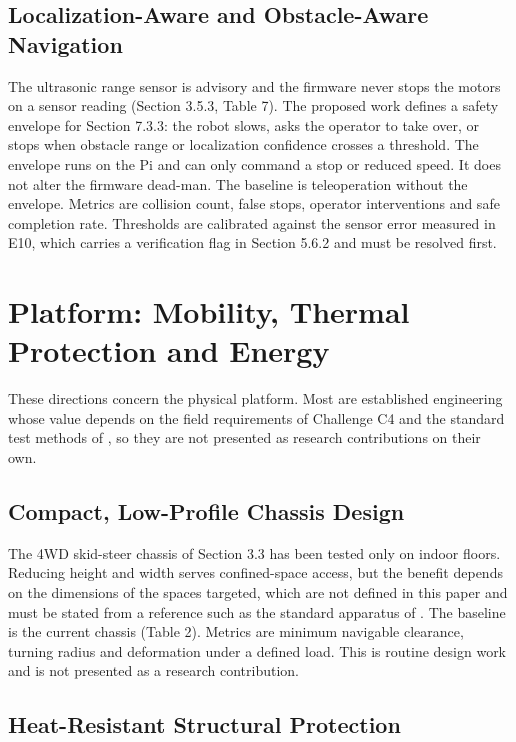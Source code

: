 \subsection{Localization-Aware and Obstacle-Aware Navigation}

The ultrasonic range sensor is advisory and the firmware never stops the motors on a sensor reading (Section 3.5.3, Table 7). The proposed work defines a safety envelope for Section 7.3.3: the robot slows, asks the operator to take over, or stops when obstacle range or localization confidence crosses a threshold. The envelope runs on the Pi and can only command a stop or reduced speed. It does not alter the firmware dead-man. The baseline is teleoperation without the envelope. Metrics are collision count, false stops, operator interventions and safe completion rate. Thresholds are calibrated against the sensor error measured in E10, which carries a verification flag in Section 5.6.2 and must be resolved first.

\section{Platform: Mobility, Thermal Protection and Energy}

These directions concern the physical platform. Most are established engineering whose value depends on the field requirements of Challenge C4 and the standard test methods of \cite{jacoff2012}, so they are not presented as research contributions on their own.

\subsection{Compact, Low-Profile Chassis Design}

The 4WD skid-steer chassis of Section 3.3 has been tested only on indoor floors. Reducing height and width serves confined-space access, but the benefit depends on the dimensions of the spaces targeted, which are not defined in this paper and must be stated from a reference such as the standard apparatus of \cite{jacoff2012}. The baseline is the current chassis (Table 2). Metrics are minimum navigable clearance, turning radius and deformation under a defined load. This is routine design work and is not presented as a research contribution.

\subsection{Heat-Resistant Structural Protection}

